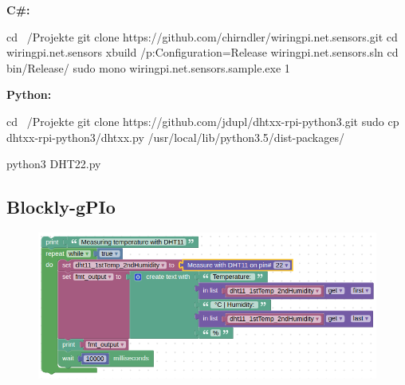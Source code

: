 \textbf{C\#:}

\begin{console}
	cd ~/Projekte
	git clone https://github.com/chirndler/wiringpi.net.sensors.git
	cd wiringpi.net.sensors
	xbuild /p:Configuration=Release wiringpi.net.sensors.sln
	cd bin/Release/
	sudo mono wiringpi.net.sensors.sample.exe 1
\end{console}

\textbf{Python:}
\begin{console}
	cd ~/Projekte
	git clone https://github.com/jdupl/dhtxx-rpi-python3.git
	sudo cp dhtxx-rpi-python3/dhtxx.py /usr/local/lib/python3.5/dist-packages/
\end{console}

\lstset{language=Python, caption=, 
        label=DHT22Program, frame=single, basicstyle=\ttfamily
	      \footnotesize, breakatwhitespace=false, showstringspaces=false, 
        showtabs=false, tabsize=2 }


\begin{console}
	python3 DHT22.py
\end{console}

\subsection{Blockly-gPIo}


\begin{figure}[ht]
	\centering
	\includegraphics[scale=0.5]{images/Blockly-gPIo_DHT11.png}
	\label{Blockly-gPIo_DHT11}
\end{figure}

